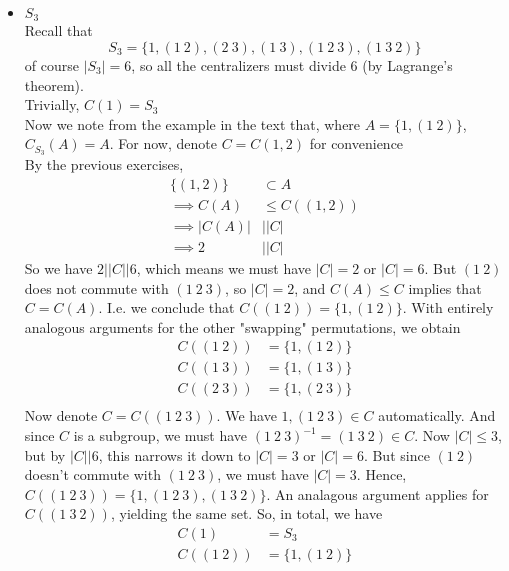 \documentclass{article}
\newcommand{\set}[1]{ \{ #1 \} }
\newcommand{\inv}[1]{ {#1}^{-1} }
\newcommand{\norm}[1]{|#1|}
\newcommand{\divides}{\big\vert}
\begin{document}
\subsubsection{}\label{ex2p4}
\begin{itemize}
\item $S_3$\\
Recall that
\begin{equation}
S_3 = \set{1,(1\ 2),(2\ 3),(1\ 3),(1\ 2\ 3),(1\ 3\ 2)}
\end{equation}
of course $|S_3| = 6$, so all the centralizers must divide $6$ (by Lagrange's theorem). \\
Trivially, $C(1) = S_3$\\
Now we note from the example in the text that, where $A=\set{1, (1\ 2)}$,  $C_{S_3}(A) = A$. For now, denote $C=C(1,2)$ for convenience\\
By the previous exercises,
\begin{align*}
\set{(1,2)} &\subset A\\
\implies C(A) &\leq C((1,2))\\
\implies \norm{C(A)} &\vert \norm{C}\\
\implies 2 &\vert \norm{C}
\end{align*}
So we have $2\vert\norm{C}\vert 6$, which means we must have $\norm{C}=2$ or $\norm{C}=6$. But $(1\ 2)$ does not commute with $(1\ 2\ 3)$, so $\norm{C}=2$, and $C(A) \leq C$ implies that $C = C(A)$. I.e. we conclude that $C( (1\ 2) ) = \set{1, (1\ 2)}$. With entirely analogous arguments for the other "swapping" permutations, we obtain
\begin{align*}
C( (1\ 2) ) &= \set{1, (1\ 2)}\\
C( (1\ 3) ) &= \set{1, (1\ 3)}\\
C( (2\ 3) ) &= \set{1, (2\ 3)}\\
\end{align*}
Now denote $C = C( (1\ 2\ 3) )$. We have $1, (1\ 2\ 3) \in C$ automatically. And since $C$ is a subgroup, we must have $\inv{(1\ 2\ 3)} = (1\ 3\ 2) \in C$. Now $\norm{C} \leq 3$, but by $\norm{C} \divides 6$, this narrows it down to $\norm{C} = 3$ or $\norm{C} = 6$. But since $(1\ 2)$ doesn't commute with $(1\ 2\ 3)$, we must have $\norm{C} = 3$. Hence, $C( (1\ 2\ 3) ) = \set{1, (1\ 2\ 3), (1\ 3\ 2)}$. An analagous argument applies for $C( (1\ 3\ 2) )$, yielding the same set. So, in total, we have
\begin{align*}
C(1) &= S_3\\
C( (1\ 2) ) &= \set{1, (1\ 2)}\\

\end{align*}
\end{itemize}
\end{document}
